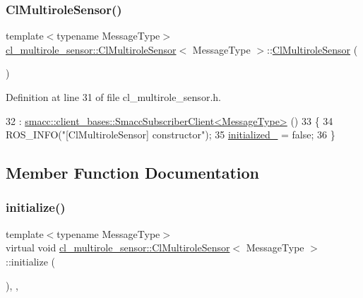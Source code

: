 \subsubsection{\texorpdfstring{Cl\+Multirole\+Sensor()}{ClMultiroleSensor()}}
{\footnotesize\ttfamily template$<$typename Message\+Type$>$ \\
\hyperlink{classcl__multirole__sensor_1_1ClMultiroleSensor}{cl\+\_\+multirole\+\_\+sensor\+::\+Cl\+Multirole\+Sensor}$<$ Message\+Type $>$\+::\hyperlink{classcl__multirole__sensor_1_1ClMultiroleSensor}{Cl\+Multirole\+Sensor} (\begin{DoxyParamCaption}{ }\end{DoxyParamCaption})\hspace{0.3cm}{\ttfamily [inline]}}



Definition at line 31 of file cl\+\_\+multirole\+\_\+sensor.\+h.


\begin{DoxyCode}
32       : \hyperlink{classsmacc_1_1client__bases_1_1SmaccSubscriberClient}{smacc::client\_bases::SmaccSubscriberClient<MessageType>}
      ()
33   \{
34     ROS\_INFO(\textcolor{stringliteral}{"[ClMultiroleSensor] constructor"});
35     \hyperlink{classcl__multirole__sensor_1_1ClMultiroleSensor_a1f2bbfd7721308cb1eae4423d5fe999b}{initialized\_} = \textcolor{keyword}{false};
36   \}
\end{DoxyCode}


\subsection{Member Function Documentation}
\mbox{\label{classcl__multirole__sensor_1_1ClMultiroleSensor_a3847e19f925f65dd034964eb2d0b3594}} 
\subsubsection{\texorpdfstring{initialize()}{initialize()}}
{\footnotesize\ttfamily template$<$typename Message\+Type$>$ \\
virtual void \hyperlink{classcl__multirole__sensor_1_1ClMultiroleSensor}{cl\+\_\+multirole\+\_\+sensor\+::\+Cl\+Multirole\+Sensor}$<$ Message\+Type $>$\+::initialize (\begin{DoxyParamCaption}{ }\end{DoxyParamCaption})\hspace{0.3cm}{\ttfamily [inline]}, {\ttfamily [override]}, {\ttfamily [virtual]}}



